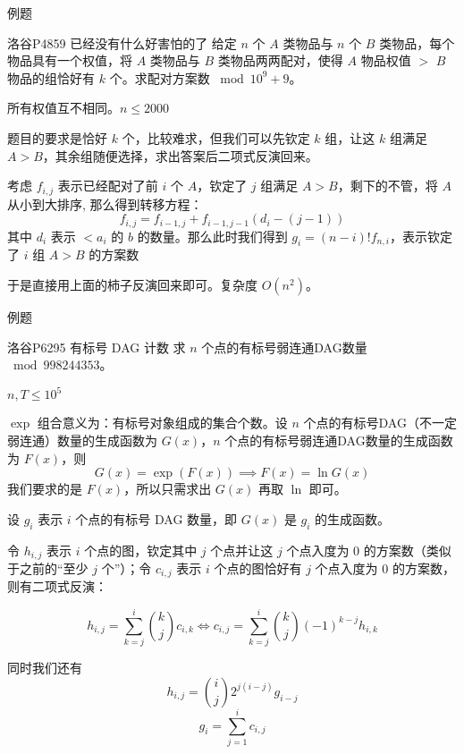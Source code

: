 \documentclass[UTF8]{beamer}
\begin{document}
    \begin{frame}{例题}
        \begin{block}{洛谷P4859 已经没有什么好害怕的了}
            给定 $n$ 个 $A$ 类物品与 $n$ 个 $B$ 类物品，每个物品具有一个权值，将 $A$ 类物品与 $B$ 类物品两两配对，使得 $A$ 物品权值 $>$ $B$ 物品的组恰好有 $k$ 个。求配对方案数 $\bmod 10^9+9$。
            
            所有权值互不相同。$n\le 2000$
        \end{block}
        \pause

        题目的要求是恰好 $k$ 个，比较难求，但我们可以先钦定 $k$ 组，让这 $k$ 组满足 $A > B$，其余组随便选择，求出答案后二项式反演回来。

        考虑 $f_{i,j}$ 表示已经配对了前 $i$ 个 $A$，钦定了 $j$ 组满足 $A > B$，剩下的不管，将 $A$ 从小到大排序, 那么得到转移方程：
        $$
        f_{i,j} = f_{i−1,j} + f_{i−1,j−1}(d_i − (j − 1))
        $$
        其中 $d_i$ 表示 $< a_i$ 的 $b$ 的数量。那么此时我们得到 $g_i = (n − i)!f_{n,i}$，表示钦定了 $i$ 组 $A > B$ 的方案数

        于是直接用上面的柿子反演回来即可。复杂度 $O(n^2)$。

    \end{frame}

    \begin{frame}{例题}
        \begin{block}{洛谷P6295 有标号 DAG 计数}
            求 $n$ 个点的有标号弱连通DAG数量 $\bmod 998244353$。

            $n,T\le 10^5$
        \end{block}
        \pause

        $\exp$ 组合意义为：有标号对象组成的集合个数。设 $n$ 个点的有标号DAG（不一定弱连通）数量的生成函数为 $G(x)$，$n$ 个点的有标号弱连通DAG数量的生成函数为 $F(x)$，则
        $$
        G(x)=\exp(F(x))\implies F(x)=\ln G(x)
        $$
        我们要求的是 $F(x)$，所以只需求出 $G(x)$ 再取 $\ln$ 即可。
    \end{frame}

    \begin{frame}
        设 $g_i$ 表示 $i$ 个点的有标号 DAG 数量，即 $G(x)$ 是 $g_i$ 的生成函数。

        令 $h_{i,j}$ 表示 $i$ 个点的图，钦定其中 $j$ 个点并让这 $j$ 个点入度为 $0$ 的方案数（类似于之前的“至少 $j$ 个”）；令 $c_{i,j}$ 表示 $i$ 个点的图恰好有 $j$ 个点入度为 $0$ 的方案数，则有二项式反演：

        $$
        h_{i,j}=\sum_{k=j}^i\binom{k}{j}c_{i,k}\iff c_{i,j}=\sum_{k=j}^i\binom{k}{j}(-1)^{k-j}h_{i,k}
        $$
        \pause

        同时我们还有
        $$
        h_{i,j} = \binom{i}{j}2^{j(i-j)}g_{i-j}
        $$
        $$
        g_i=\sum_{j=1}^ic_{i,j}
        $$
    \end{frame}
\end{document}
